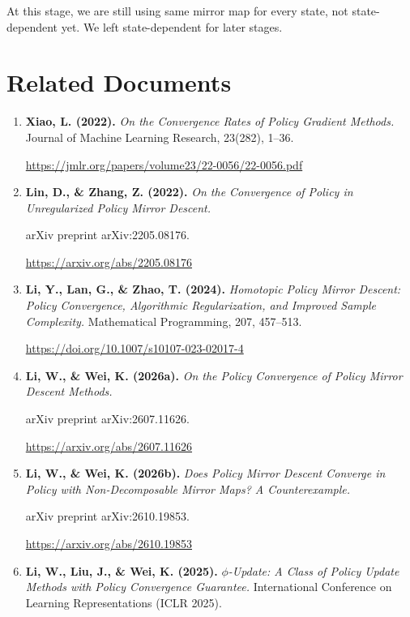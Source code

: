 \documentclass[11pt,a4paper]{article}
\begin{document}
\begin{note}
At this stage, we are still using same mirror map for every state, not state-dependent yet. We left state-dependent for later stages.
\end{note}

\section{Related Documents}

\begin{enumerate}

    \item \textbf{Xiao, L. (2022).}
    \textit{On the Convergence Rates of Policy Gradient Methods.}
    Journal of Machine Learning Research, 23(282), 1--36.

    \url{https://jmlr.org/papers/volume23/22-0056/22-0056.pdf}


    \item \textbf{Lin, D., \& Zhang, Z. (2022).}
    \textit{On the Convergence of Policy in Unregularized
    Policy Mirror Descent.}

    arXiv preprint arXiv:2205.08176.

    \url{https://arxiv.org/abs/2205.08176}


    \item \textbf{Li, Y., Lan, G., \& Zhao, T. (2024).}
    \textit{Homotopic Policy Mirror Descent: Policy Convergence,
    Algorithmic Regularization, and Improved Sample Complexity.}
    Mathematical Programming, 207, 457--513.

    \url{https://doi.org/10.1007/s10107-023-02017-4}

    \item \textbf{Li, W., \& Wei, K. (2026a).}
    \textit{On the Policy Convergence of Policy Mirror
    Descent Methods.}

    arXiv preprint arXiv:2607.11626.

    \url{https://arxiv.org/abs/2607.11626}


    \item \textbf{Li, W., \& Wei, K. (2026b).}
    \textit{Does Policy Mirror Descent Converge in Policy
    with Non-Decomposable Mirror Maps? A Counterexample.}

    arXiv preprint arXiv:2610.19853.

    \url{https://arxiv.org/abs/2610.19853}


    \item \textbf{Li, W., Liu, J., \& Wei, K. (2025).}
    \textit{$\phi$-Update: A Class of Policy Update Methods
    with Policy Convergence Guarantee.}
    International Conference on Learning Representations
    (ICLR 2025).


\end{enumerate}
\end{document}
